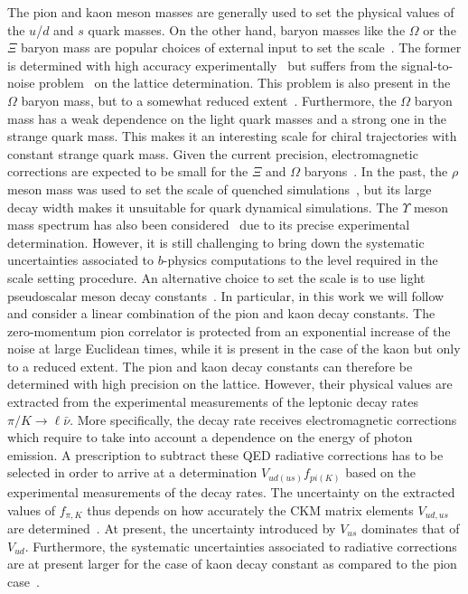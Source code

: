 The pion and kaon meson masses are generally used to set the physical values of the $u$/$d$ and $s$ quark masses. On the other hand, baryon masses like the $\Omega$ or the $\Xi$ baryon mass are popular choices of external input to set the scale~\citep{BMW:2012hcm,Miller:2020evg,RQCD_scale}. The former is determined with high accuracy experimentally~\citep{ParticleDataGroup:2020ssz} but suffers from the signal-to-noise problem~\citep{Lepage:1989hd,Luscher:2010ae} on the lattice determination. This problem is also present in the $\Omega$ baryon mass, but to a somewhat reduced extent~\citep{BMW:2012hcm,Miller:2020evg}. Furthermore, the $\Omega$ baryon mass has a weak dependence on the light quark masses and a strong one in the strange quark mass. This makes it an interesting scale for chiral trajectories with constant strange quark mass. Given the current precision, electromagnetic corrections are expected to be small for the $\Xi$ and $\Omega$ baryons~\cite{RQCD_scale}. In the past, the $\rho$ meson mass was used to set the scale of quenched simulations~\citep{Mawhinney:1996jk,Irving:1998yu,Bornyakov:2015plz}, but  its large decay width makes it unsuitable for quark dynamical simulations. The $\Upsilon$ meson mass spectrum has also been considered~\citep{HPQCD:2011qw,Gray:2005ur} due to its precise experimental determination. However, it is still challenging to bring down the systematic uncertainties associated to $b$-physics computations to the level required in the scale setting procedure. An alternative choice to set the scale is to use light pseudoscalar meson decay constants~\citep{Brown:2018jtv,BMW:2012hcm,BMW:2012hcm,Bruno:2016plf,Strassberger:2023xnj}. In particular, in this work we will follow~\citep{Bruno:2016plf} and consider a linear combination of the pion and kaon decay constants. The zero-momentum pion correlator is protected from an exponential increase of the noise at large Euclidean times, while it is present in the case of the kaon but only to a  reduced extent. The pion and kaon decay constants can therefore be determined with high precision on the lattice. However, their physical values are extracted from the experimental measurements of the leptonic decay rates $\pi/K\to\ell\bar{\nu}$. More specifically, the decay rate receives electromagnetic corrections which require to take into account a dependence on the energy of photon emission. A prescription to subtract these QED radiative corrections has to be selected in order to arrive at a determination $V_{ud(us)}f_{pi(K)}$ based on the experimental measurements of the decay rates. The uncertainty on the extracted values of $f_{\pi,K}$ thus depends on how accurately the CKM matrix elements $V_{ud,us}$ are determined~\citep{FlavourLatticeAveragingGroupFLAG:2021npn}. At present, the uncertainty introduced by $V_{us}$ dominates that of $V_{ud}$. Furthermore, the systematic uncertainties associated to radiative corrections are at present larger for the case of kaon decay constant as compared to the pion case~\citep{FlavourLatticeAveragingGroupFLAG:2021npn}.

